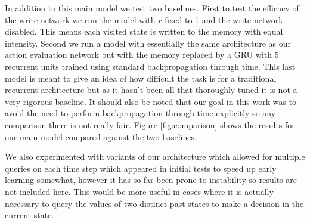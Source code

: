 \documentclass{article}
\begin{document}
In addition to this main model we test two baselines. First to test the efficacy of the write network we run the model with $r$ fixed to 1 and the write network disabled. This means each visited state is written to the memory with equal intensity. Second we run a model with essentially the same architecture as our action evaluation network but with the memory replaced by a GRU with 5 recurrent units trained using standard backpropagation through time. This last model is meant to give an idea of how difficult the task is for a traditional recurrent architecture but as it hasn't been all that thoroughly tuned it is not a very rigorous baseline. It should also be noted that our goal in this work was to avoid the need to perform backpropagation through time explicitly so any comparison there is not really fair. Figure \ref{fig:comparison} shows  the results for our main model compared against the two baselines.

We also experimented with variants of our architecture which allowed for multiple queries on each time step which appeared in initial tests to speed up early learning somewhat, however it has so far been prone to instability so results are not included here. This would be more useful in cases where it is actually necessary to query the values of two distinct past states to make a decision in the current state.
\end{document}
